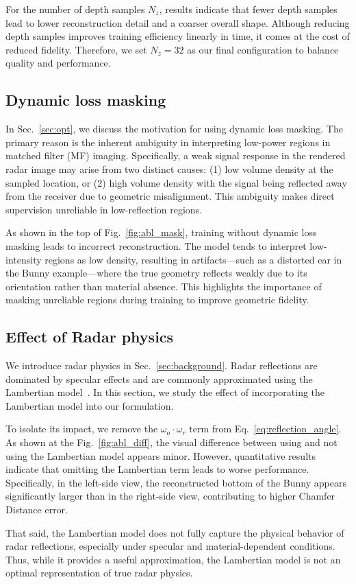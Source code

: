 For the number of depth samples \( N_z \), results indicate that fewer depth samples lead to lower reconstruction detail and a coarser overall shape.
Although reducing depth samples improves training efficiency linearly in time, it comes at the cost of reduced fidelity.
Therefore, we set \( N_z = 32 \) as our final configuration to balance quality and performance.

\subsection{Dynamic loss masking}

In Sec.~\ref{sec:opt}, we discuss the motivation for using dynamic loss masking.
The primary reason is the inherent ambiguity in interpreting low-power regions in matched filter (MF) imaging.
Specifically, a weak signal response in the rendered radar image may arise from two distinct causes:
(1) low volume density at the sampled location, or
(2) high volume density with the signal being reflected away from the receiver due to geometric misalignment.
This ambiguity makes direct supervision unreliable in low-reflection regions.

As shown in the top of Fig.~\ref{fig:abl_mask}, training without dynamic loss masking leads to incorrect reconstruction.
The model tends to interpret low-intensity regions as low density, resulting in artifacts—such as a distorted ear in the Bunny example—where the true geometry reflects weakly due to its orientation rather than material absence.
This highlights the importance of masking unreliable regions during training to improve geometric fidelity.


\subsection{Effect of Radar physics}
We introduce radar physics in Sec.~\ref{sec:background}.
Radar reflections are dominated by specular effects and are commonly approximated using the Lambertian model~\cite{richards2010principles}.
In this section, we study the effect of incorporating the Lambertian model into our formulation.

To isolate its impact, we remove the \( \omega_o \cdot \omega_r \) term from Eq.~\ref{eq:reflection_angle}.
As shown at the Fig.~\ref{fig:abl_diff}, the visual difference between using and not using the Lambertian model appears minor.
However, quantitative results indicate that omitting the Lambertian term leads to worse performance.
Specifically, in the left-side view, the reconstructed bottom of the Bunny appears significantly larger than in the right-side view, contributing to higher Chamfer Distance error.

That said, the Lambertian model does not fully capture the physical behavior of radar reflections, especially under specular and material-dependent conditions.
Thus, while it provides a useful approximation, the Lambertian model is not an optimal representation of true radar physics.
